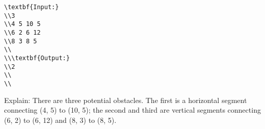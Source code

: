 \begin{verbatim}
\textbf{Input:}
\\3 
\\4 5 10 5 
\\6 2 6 12 
\\8 3 8 5 
\\
\\\textbf{Output:}
\\2
\\
\\\end{verbatim}

   Explain:       There are three potential obstacles. The first is a horizontal segment connecting (4, 5) to (10, 5); the second and third are vertical segments connecting (6, 2) to (6, 12) and (8, 3) to (8, 5).